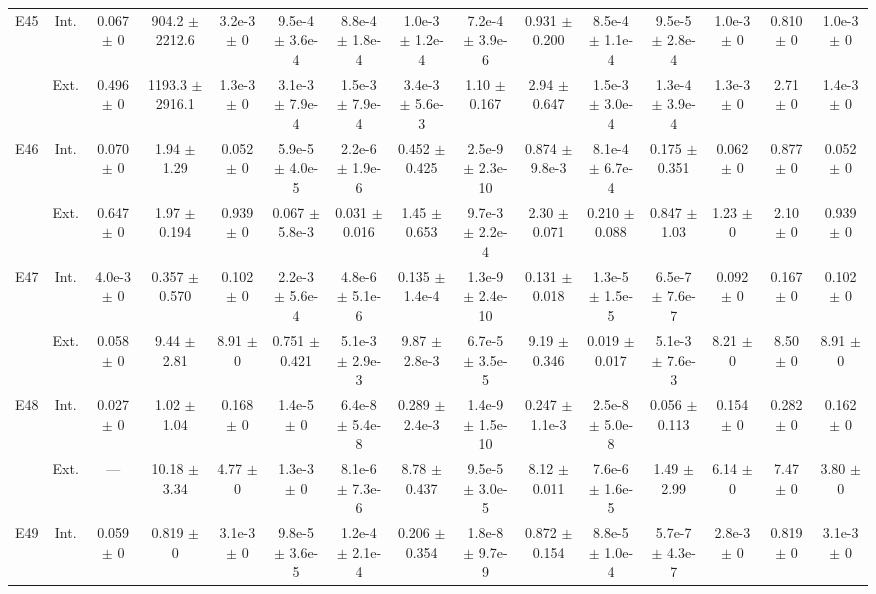 \begin{table}[htbp]
{\begin{tabular}{@{}ccccccccccccccc@{}}
\cline{2-15}
\multirow{2}{*}{E45} & Int. & 0.067 $\pm$ 0 & 904.2 $\pm$ 2212.6 & 3.2e-3 $\pm$ 0 & 9.5e-4 $\pm$ 3.6e-4 & 8.8e-4 $\pm$ 1.8e-4 & 1.0e-3 $\pm$ 1.2e-4 & 7.2e-4 $\pm$ 3.9e-6 & 0.931 $\pm$ 0.200 & 8.5e-4 $\pm$ 1.1e-4 & 9.5e-5 $\pm$ 2.8e-4 & 1.0e-3 $\pm$ 0 & 0.810 $\pm$ 0 & 1.0e-3 $\pm$ 0 \\
 & Ext. & 0.496 $\pm$ 0 & 1193.3 $\pm$ 2916.1 & 1.3e-3 $\pm$ 0 & 3.1e-3 $\pm$ 7.9e-4 & 1.5e-3 $\pm$ 7.9e-4 & 3.4e-3 $\pm$ 5.6e-3 & 1.10 $\pm$ 0.167 & 2.94 $\pm$ 0.647 & 1.5e-3 $\pm$ 3.0e-4 & 1.3e-4 $\pm$ 3.9e-4 & 1.3e-3 $\pm$ 0 & 2.71 $\pm$ 0 & 1.4e-3 $\pm$ 0 \\
\cline{2-15}
\multirow{2}{*}{E46} & Int. & 0.070 $\pm$ 0 & 1.94 $\pm$ 1.29 & 0.052 $\pm$ 0 & 5.9e-5 $\pm$ 4.0e-5 & 2.2e-6 $\pm$ 1.9e-6 & 0.452 $\pm$ 0.425 & 2.5e-9 $\pm$ 2.3e-10 & 0.874 $\pm$ 9.8e-3 & 8.1e-4 $\pm$ 6.7e-4 & 0.175 $\pm$ 0.351 & 0.062 $\pm$ 0 & 0.877 $\pm$ 0 & 0.052 $\pm$ 0 \\
 & Ext. & 0.647 $\pm$ 0 & 1.97 $\pm$ 0.194 & 0.939 $\pm$ 0 & 0.067 $\pm$ 5.8e-3 & 0.031 $\pm$ 0.016 & 1.45 $\pm$ 0.653 & 9.7e-3 $\pm$ 2.2e-4 & 2.30 $\pm$ 0.071 & 0.210 $\pm$ 0.088 & 0.847 $\pm$ 1.03 & 1.23 $\pm$ 0 & 2.10 $\pm$ 0 & 0.939 $\pm$ 0 \\
\cline{2-15}
\multirow{2}{*}{E47} & Int. & 4.0e-3 $\pm$ 0 & 0.357 $\pm$ 0.570 & 0.102 $\pm$ 0 & 2.2e-3 $\pm$ 5.6e-4 & 4.8e-6 $\pm$ 5.1e-6 & 0.135 $\pm$ 1.4e-4 & 1.3e-9 $\pm$ 2.4e-10 & 0.131 $\pm$ 0.018 & 1.3e-5 $\pm$ 1.5e-5 & 6.5e-7 $\pm$ 7.6e-7 & 0.092 $\pm$ 0 & 0.167 $\pm$ 0 & 0.102 $\pm$ 0 \\
 & Ext. & 0.058 $\pm$ 0 & 9.44 $\pm$ 2.81 & 8.91 $\pm$ 0 & 0.751 $\pm$ 0.421 & 5.1e-3 $\pm$ 2.9e-3 & 9.87 $\pm$ 2.8e-3 & 6.7e-5 $\pm$ 3.5e-5 & 9.19 $\pm$ 0.346 & 0.019 $\pm$ 0.017 & 5.1e-3 $\pm$ 7.6e-3 & 8.21 $\pm$ 0 & 8.50 $\pm$ 0 & 8.91 $\pm$ 0 \\
\cline{2-15}
\multirow{2}{*}{E48} & Int. & 0.027 $\pm$ 0 & 1.02 $\pm$ 1.04 & 0.168 $\pm$ 0 & 1.4e-5 $\pm$ 0 & 6.4e-8 $\pm$ 5.4e-8 & 0.289 $\pm$ 2.4e-3 & 1.4e-9 $\pm$ 1.5e-10 & 0.247 $\pm$ 1.1e-3 & 2.5e-8 $\pm$ 5.0e-8 & 0.056 $\pm$ 0.113 & 0.154 $\pm$ 0 & 0.282 $\pm$ 0 & 0.162 $\pm$ 0 \\
 & Ext. & --- & 10.18 $\pm$ 3.34 & 4.77 $\pm$ 0 & 1.3e-3 $\pm$ 0 & 8.1e-6 $\pm$ 7.3e-6 & 8.78 $\pm$ 0.437 & 9.5e-5 $\pm$ 3.0e-5 & 8.12 $\pm$ 0.011 & 7.6e-6 $\pm$ 1.6e-5 & 1.49 $\pm$ 2.99 & 6.14 $\pm$ 0 & 7.47 $\pm$ 0 & 3.80 $\pm$ 0 \\
\cline{2-15}
\multirow{2}{*}{E49} & Int. & 0.059 $\pm$ 0 & 0.819 $\pm$ 0 & 3.1e-3 $\pm$ 0 & 9.8e-5 $\pm$ 3.6e-5 & 1.2e-4 $\pm$ 2.1e-4 & 0.206 $\pm$ 0.354 & 1.8e-8 $\pm$ 9.7e-9 & 0.872 $\pm$ 0.154 & 8.8e-5 $\pm$ 1.0e-4 & 5.7e-7 $\pm$ 4.3e-7 & 2.8e-3 $\pm$ 0 & 0.819 $\pm$ 0 & 3.1e-3 $\pm$ 0 \\

\end{tabular}}
\end{table}
